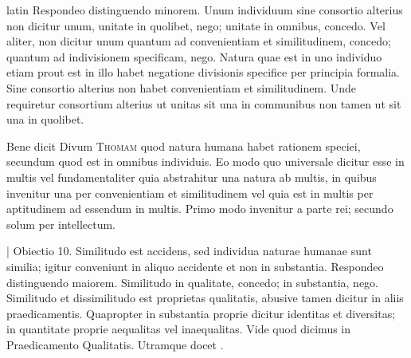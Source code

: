 \begin{otherlanguage*}{latin}
\pstart
 Respondeo distinguendo minorem. Unum individuum sine consortio alterius non dicitur unum, unitate in quolibet, nego; unitate in omnibus, concedo. Vel aliter, non dicitur unum quantum ad convenientiam et similitudinem, concedo; quantum ad indivisionem specificam, nego. Natura quae est in uno individuo etiam prout est in illo habet negatione divisionis specifice per principia formalia. Sine consortio alterius non habet convenientiam et similitudinem. Unde requiretur consortium alterius ut unitas sit una in communibus non tamen ut sit una in quolibet. 
\pend

\pstart
 Bene dicit Divum \textsc{Thomam} quod natura humana habet rationem  speciei, secundum quod est in omnibus individuis. Eo modo quo universale dicitur esse in multis vel fundamentaliter quia abstrahitur una natura ab multis, in quibus invenitur una per convenientiam et similitudinem vel quia est in multis per aptitudinem ad essendum in multis. Primo modo invenitur a parte rei; secundo solum per intellectum. 
\pend

\pstart
 \textnormal{|} Obiectio 10. Similitudo est accidens, sed individua naturae humanae sunt similia; igitur conveniunt in aliquo accidente et non in substantia. Respondeo distinguendo maiorem. Similitudo in qualitate, concedo; in substantia, nego. Similitudo et dissimilitudo est proprietas qualitatis, abusive tamen dicitur in aliis praedicamentis. Quapropter in substantia proprie dicitur identitas et diversitas; in quantitate proprie aequalitas vel inaequalitas. Vide quod dicimus in Praedicamento Qualitatis. Utramque docet . 
\pend


\end{otherlanguage*}
